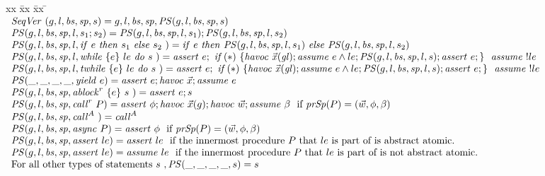 \begin{figure*}
\begin{tabbing}
xx \= xx \= xx \= \kill
\noindent
$
\begin{array}{l}
\SeqVer(\varsG, \varsL, \bodies, \specs, s) = \varsG, \varsL, \bodies, \specs, \SeqProcStmt(\varsG, \varsL, \bodies, \specs,s)\\
\SeqProcStmt(\varsG, \varsL, \bodies, \specs, l, s_1; s_2) =  \SeqProcStmt(\varsG, \varsL, \bodies, \specs, l, s_1);   \SeqProcStmt(\varsG, \varsL, \bodies, \specs, l, s_2)\\
\SeqProcStmt(\varsG, \varsL, \bodies, \specs, l, \ite{e}{s_1}{ s_2}) =  \ite{e}{\SeqProcStmt(\varsG, \varsL, \bodies, \specs, l, s_1)}{\SeqProcStmt(\varsG, \varsL, \bodies, \specs, l, s_2)}\\
\SeqProcStmt(\varsG, \varsL, \bodies, \specs, l, \while{e}{le}{s}) =  \assert{e};\ \textit{if}\ {(*)}\ { \{ \havoc{\xs(\vars)}; \assume{e \wedge le}; \SeqProcStmt(\varsG, \varsL, \bodies, \specs, l, s); \assert{e};\}\ }\  \assume{!le}\\
\SeqProcStmt(\varsG, \varsL, \bodies, \specs, l, \termwhile{e}{le}{s}) =  \assert{e};\ \textit{if}\ {(*)}\ { \{ \havoc{\xs(\vars)}; \assume{e \wedge le}; \SeqProcStmt(\varsG, \varsL, \bodies, \specs, l, s); \assert{e};\}\ }\  \assume{!le}\\
\SeqProcStmt(\_, \_, \_, \_, \yield{e}) =  \assert{e}; \havoc{\vec{x}}; \assume{e}\\
\SeqProcStmt(\varsG, \varsL, \bodies, \specs, \ablock{e}{s}{r}) =  \assert{e}; s\\
\SeqProcStmt(\varsG, \varsL, \bodies, \specs, \call {r}{P}) =  \assert{\phi}; \havoc{\vec{x}(g)}; \havoc{\vec{w}}; \assume{\beta}\ \mbox{ if}\ \procSpecs(P) = (\vec{w}, \phi, \beta)\\
\SeqProcStmt(\varsG, \varsL, \bodies, \specs, \call{A}) =  \call{A}\\
\SeqProcStmt(\varsG, \varsL, \bodies, \specs, \async{P}) =  \assert{\phi}\ \mbox{ if}\ \procSpecs(P) = (\vec{w}, \phi, \beta)\\
\SeqProcStmt(\varsG, \varsL, \bodies, \specs, \assert{le}) =  \assert{le}\ \mbox{ if the innermost procedure $P$ that $le$ is part of is abstract atomic.}\ \\
\SeqProcStmt(\varsG, \varsL, \bodies, \specs, \assert{le}) =  \assume{le}\ \mbox{ if the innermost procedure $P$ that $le$ is part of is not abstract atomic.}\ \\
\mbox{For all other types of statements $s$}\ , \SeqProcStmt(\_, \_, \_, \_,s) =  s\\
\end{array}
$
\end{tabbing}
\end{figure*}

